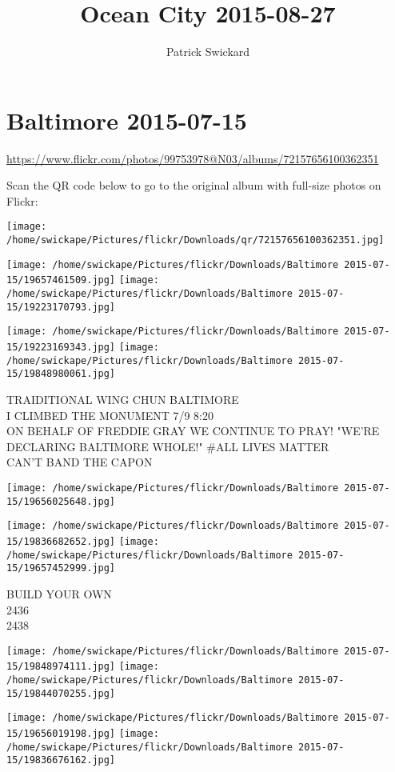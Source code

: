 \documentclass[10pt,letterpaper]{article}
\title{Ocean City 2015-08-27}
\author{Patrick Swickard}
\date{}
\begin{document}
\section*{Baltimore 2015-07-15}

\url{https://www.flickr.com/photos/99753978@N03/albums/72157656100362351}

Scan the QR code below to go to the original album with full-size photos on Flickr:

\texttt{[image: /home/swickape/Pictures/flickr/Downloads/qr/72157656100362351.jpg]}
\pagebreak

\texttt{[image: /home/swickape/Pictures/flickr/Downloads/Baltimore 2015-07-15/19657461509.jpg]}
\texttt{[image: /home/swickape/Pictures/flickr/Downloads/Baltimore 2015-07-15/19223170793.jpg]}

\texttt{[image: /home/swickape/Pictures/flickr/Downloads/Baltimore 2015-07-15/19223169343.jpg]}
\texttt{[image: /home/swickape/Pictures/flickr/Downloads/Baltimore 2015-07-15/19848980061.jpg]}

TRAIDITIONAL WING CHUN BALTIMORE\\
I CLIMBED THE MONUMENT 7/9 8:20\\
ON BEHALF OF FREDDIE GRAY WE CONTINUE TO PRAY!  "WE'RE DECLARING BALTIMORE WHOLE!"  \#ALL LIVES MATTER\\
CAN'T BAND THE CAPON
\pagebreak

\texttt{[image: /home/swickape/Pictures/flickr/Downloads/Baltimore 2015-07-15/19656025648.jpg]}

\vspace{0.25in}
\texttt{[image: /home/swickape/Pictures/flickr/Downloads/Baltimore 2015-07-15/19836682652.jpg]}
\texttt{[image: /home/swickape/Pictures/flickr/Downloads/Baltimore 2015-07-15/19657452999.jpg]}

BUILD YOUR OWN\\
2436\\
2438
\pagebreak

\texttt{[image: /home/swickape/Pictures/flickr/Downloads/Baltimore 2015-07-15/19848974111.jpg]}
\texttt{[image: /home/swickape/Pictures/flickr/Downloads/Baltimore 2015-07-15/19844070255.jpg]}

\texttt{[image: /home/swickape/Pictures/flickr/Downloads/Baltimore 2015-07-15/19656019198.jpg]}
\texttt{[image: /home/swickape/Pictures/flickr/Downloads/Baltimore 2015-07-15/19836676162.jpg]}
\end{document}
